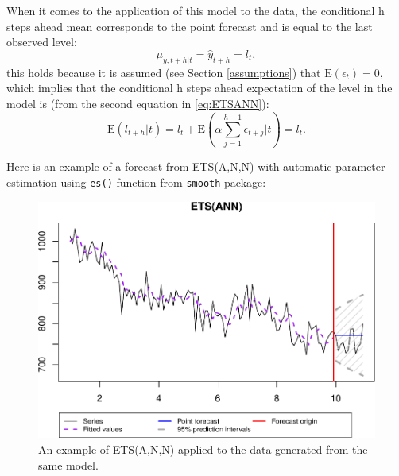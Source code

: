 \documentclass[
]{book}
\newenvironment{Shaded}{\begin{snugshade}}{\end{snugshade}}
\newcommand{\AttributeTok}[1]{\textcolor[rgb]{0.77,0.63,0.00}{#1}}
\newcommand{\CommentTok}[1]{\textcolor[rgb]{0.56,0.35,0.01}{\textit{#1}}}
\newcommand{\ConstantTok}[1]{\textcolor[rgb]{0.00,0.00,0.00}{#1}}
\newcommand{\DecValTok}[1]{\textcolor[rgb]{0.00,0.00,0.81}{#1}}
\newcommand{\FloatTok}[1]{\textcolor[rgb]{0.00,0.00,0.81}{#1}}
\newcommand{\FunctionTok}[1]{\textcolor[rgb]{0.00,0.00,0.00}{#1}}
\newcommand{\NormalTok}[1]{#1}
\newcommand{\OtherTok}[1]{\textcolor[rgb]{0.56,0.35,0.01}{#1}}
\newcommand{\SpecialCharTok}[1]{\textcolor[rgb]{0.00,0.00,0.00}{#1}}
\newcommand{\StringTok}[1]{\textcolor[rgb]{0.31,0.60,0.02}{#1}}
\theoremstyle{definition}
\theoremstyle{definition}
\theoremstyle{definition}
\theoremstyle{definition}
\theoremstyle{remark}
\begin{document}
When it comes to the application of this model to the data, the conditional h steps ahead mean corresponds to the point forecast and is equal to the last observed level:
\begin{equation}
    \mu_{y,t+h|t} = \hat{y}_{t+h} = l_{t} ,
  \label{eq:ETSANNForecast}
\end{equation}
this holds because it is assumed (see Section \ref{assumptions}) that \(\text{E}(\epsilon_t)=0\), which implies that the conditional h steps ahead expectation of the level in the model is (from the second equation in \eqref{eq:ETSANN}):
\begin{equation}
  \text{E}(l_{t+h}|t) = l_t + \text{E}(\alpha\sum_{j=1}^{h-1}\epsilon_{t+j}|t) = l_t .
  \label{eq:ETSANNForecasthStepsAhead}
\end{equation}

Here is an example of a forecast from ETS(A,N,N) with automatic parameter estimation using \texttt{es()} function from \texttt{smooth} package:

\begin{Shaded}
\end{Shaded}

\begin{figure}
\centering
\includegraphics{adam_files/figure-latex/ETSANNExample-1.pdf}
\caption{\label{fig:ETSANNExample}An example of ETS(A,N,N) applied to the data generated from the same model.}
\end{figure}
\end{document}
